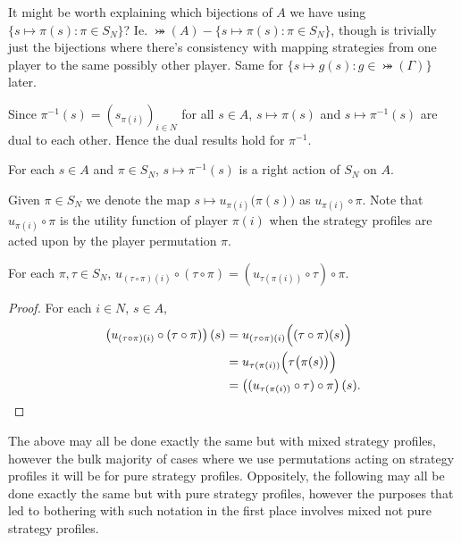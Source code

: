 It might be worth explaining which bijections of $A$ we have using $\{s\mapsto\pi(s): \pi \in S_N\}$? Ie. $\bij(A)-\{s\mapsto\pi(s): \pi \in S_N\}$, though is trivially just the bijections where there's consistency with mapping strategies from one player to the same possibly other player. Same for $\{s\mapsto g(s): g \in \bij(\Gamma)\}$ later. 

Since $\pi^{-1}(s) = (s_{\pi(i)})_{i \in N}$ for all $s \in A$, $s \mapsto \pi(s)$ and $s \mapsto \pi^{-1}(s)$ are dual to each other. Hence the dual results hold for $\pi^{-1}$.

\begin{lemma} 
	For each $s \in A$ and $\pi \in S_N$, $s \mapsto \pi^{-1}(s)$ is a right action of $S_N$ on $A$.
\end{lemma}

Given $\pi \in S_N$ we denote the map $s \mapsto u_{\pi(i)}\bigl(\pi(s)\bigr)$ as $u_{\pi(i)} \circ \pi$. Note that $u_{\pi(i)} \circ \pi$ is the utility function of player $\pi(i)$ when the strategy profiles are acted upon by the player permutation $\pi$.

\begin{corollary} \label{utilityactionprop}
	For each $\pi, \tau \in S_N$, $u_{(\tau \circ \pi)(i)} \circ (\tau \circ \pi) = (u_{\tau(\pi(i))} \circ \tau) \circ \pi$.
	\begin{proof}
		For each $i \in N$, $s \in A$, 
		\begin{align*}
			\left(u_{(\tau \circ \pi)(i)} \circ (\tau \circ \pi)\right)(s) &= u_{(\tau \circ \pi)(i)}\Bigl((\tau \circ \pi)(s)\Bigr) \\
			&= u_{\tau(\pi(i))}\Bigl(\tau\bigl(\pi(s)\bigr)\Bigr) \\
			&= \left((u_{\tau(\pi(i))} \circ \tau) \circ \pi\right)(s).
		\end{align*}
	\end{proof}
\end{corollary}

The above may all be done exactly the same but with mixed strategy profiles, however the bulk majority of cases where we use permutations acting on strategy profiles it will be for pure strategy profiles. Oppositely, the following may all be done exactly the same but with pure strategy profiles, however the purposes that led to bothering with such notation in the first place involves mixed not pure strategy profiles. 


